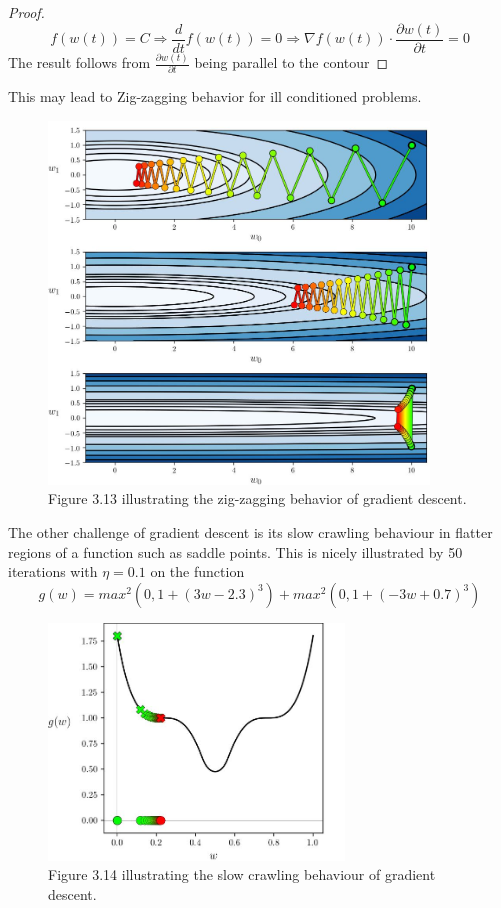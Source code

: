 \documentclass{article}
\begin{document}
\begin{proof}
$$f(w(t)) = C \Rightarrow \frac{d}{dt} f(w(t)) = 0 \Rightarrow \nabla f(w(t)) \cdot \frac{\partial w(t)}{\partial t} = 0$$
The result follows from $\frac{\partial w(t)}{\partial t}$ being parallel to the contour
\end{proof}

This may lead to Zig-zagging behavior for ill conditioned problems.

\begin{figure}[H]
    \centering
    \includegraphics[width=0.9\textwidth]{Project2/figures/Gradient_descent_zigzag.jpeg}
    \caption{Figure 3.13 \cite[p.~68]{MLRefined} illustrating the zig-zagging behavior
of gradient descent.}
    \label{fig:zigzagGradientDescent}
\end{figure}

The other challenge of gradient descent is its slow crawling behaviour in flatter regions of a function such as saddle points.  
This is nicely illustrated by 50 iterations with $\eta = 0.1$ on the function 
\[g(w) =  max^2(0, 1 + (3w - 2.3)^3) + max^2(0, 1 + (-3w + 0.7)^3)\]

\begin{figure}[H]
    \centering
    \includegraphics[width=0.7\textwidth]{Project2/figures/Gradient_descent_saddle_crawl.jpeg}
    \caption{Figure 3.14 \cite[p.~70]{MLRefined} illustrating the slow crawling behaviour
of gradient descent.}
    \label{fig:CrawlGradientDescent}
\end{figure}
\end{document}
